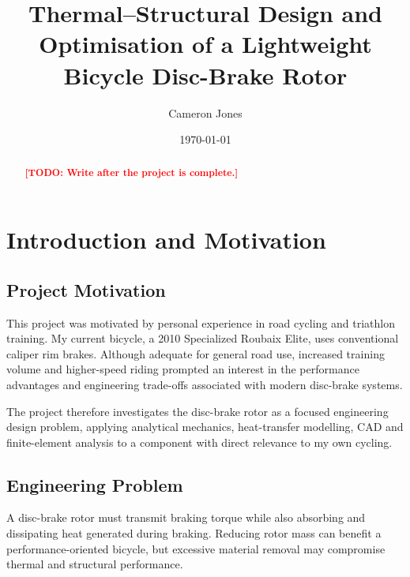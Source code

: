\documentclass[11pt,a4paper]{article}
\title{
    \textbf{Thermal--Structural Design and Optimisation of a Lightweight Bicycle Disc-Brake Rotor}
}
\author{Cameron Jones}
\date{\today}
\newcommand{\todo}[1]{\textcolor{red}{\textbf{[TODO: #1]}}}
\begin{document}
\maketitle

\begin{abstract}

%

\todo{Write after the project is complete.}

\end{abstract}

\tableofcontents

\newpage


\section{Introduction and Motivation}

\subsection{Project Motivation}

This project was motivated by personal experience in road cycling and triathlon
training. My current bicycle, a 2010 Specialized Roubaix Elite, uses conventional
caliper rim brakes. Although adequate for general road use, increased training
volume and higher-speed riding prompted an interest in the performance advantages
and engineering trade-offs associated with modern disc-brake systems.

The project therefore investigates the disc-brake rotor as a focused engineering
design problem, applying analytical mechanics, heat-transfer modelling, CAD and
finite-element analysis to a component with direct relevance to my own cycling.


\subsection{Engineering Problem}

A disc-brake rotor must transmit braking torque while also absorbing and
dissipating heat generated during braking. Reducing rotor mass can benefit a
performance-oriented bicycle, but excessive material removal may compromise
thermal and structural performance.
\end{document}
